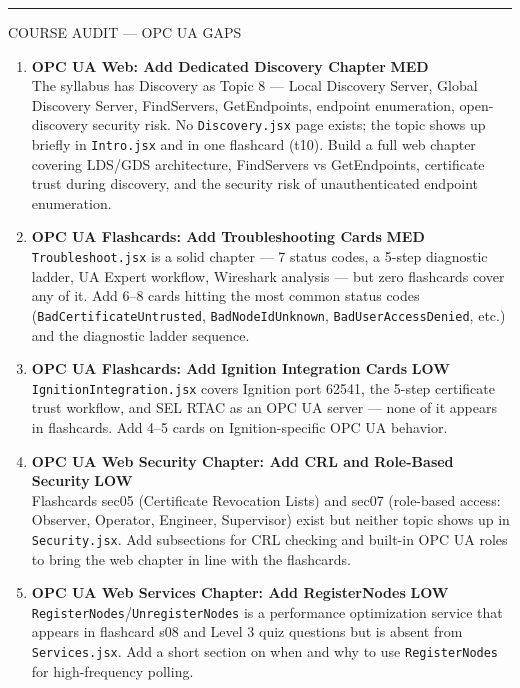 \documentclass[10pt]{article}
\newcommand{\med}{\textcolor{samber}{\small\bfseries MED}}
\newcommand{\low}{\textcolor{sgreen}{\small\bfseries LOW}}
\begin{document}
\smallskip
{\color{snavy}\rule{\linewidth}{0.4pt}}
\smallskip

{\small\sffamily\color{sgray}\MakeUppercase{Course Audit — OPC UA Gaps}}
\smallskip

\begin{enumerate}[resume]\small
  \item \textbf{OPC UA Web: Add Dedicated Discovery Chapter} \hfill \med \\
    The syllabus has Discovery as Topic 8 — Local Discovery Server, Global Discovery Server, FindServers, GetEndpoints, endpoint enumeration, open-discovery security risk. No \texttt{Discovery.jsx} page exists; the topic shows up briefly in \texttt{Intro.jsx} and in one flashcard (t10). Build a full web chapter covering LDS/GDS architecture, FindServers vs GetEndpoints, certificate trust during discovery, and the security risk of unauthenticated endpoint enumeration.

  \item \textbf{OPC UA Flashcards: Add Troubleshooting Cards} \hfill \med \\
    \texttt{Troubleshoot.jsx} is a solid chapter — 7 status codes, a 5-step diagnostic ladder, UA Expert workflow, Wireshark analysis — but zero flashcards cover any of it. Add 6--8 cards hitting the most common status codes (\texttt{BadCertificateUntrusted}, \texttt{BadNodeIdUnknown}, \texttt{BadUserAccessDenied}, etc.) and the diagnostic ladder sequence.

  \item \textbf{OPC UA Flashcards: Add Ignition Integration Cards} \hfill \low \\
    \texttt{IgnitionIntegration.jsx} covers Ignition port 62541, the 5-step certificate trust workflow, and SEL RTAC as an OPC UA server — none of it appears in flashcards. Add 4--5 cards on Ignition-specific OPC UA behavior.

  \item \textbf{OPC UA Web Security Chapter: Add CRL and Role-Based Security} \hfill \low \\
    Flashcards sec05 (Certificate Revocation Lists) and sec07 (role-based access: Observer, Operator, Engineer, Supervisor) exist but neither topic shows up in \texttt{Security.jsx}. Add subsections for CRL checking and built-in OPC UA roles to bring the web chapter in line with the flashcards.

  \item \textbf{OPC UA Web Services Chapter: Add RegisterNodes} \hfill \low \\
    \texttt{RegisterNodes}/\texttt{UnregisterNodes} is a performance optimization service that appears in flashcard s08 and Level 3 quiz questions but is absent from \texttt{Services.jsx}. Add a short section on when and why to use \texttt{RegisterNodes} for high-frequency polling.
\end{enumerate}
\end{document}
